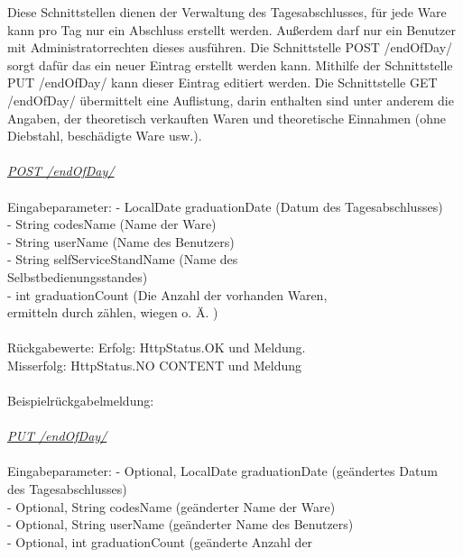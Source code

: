 Diese Schnittstellen dienen der Verwaltung des Tagesabschlusses, für jede Ware kann pro Tag nur ein Abschluss erstellt werden. Außerdem darf nur ein Benutzer mit Administratorrechten dieses ausführen.
Die Schnittstelle POST /endOfDay/ sorgt dafür das ein neuer Eintrag erstellt werden kann.
Mithilfe der Schnittstelle PUT /endOfDay/ kann dieser Eintrag editiert werden.
Die Schnittstelle GET /endOfDay/ übermittelt eine Auflistung, darin enthalten sind unter anderem die Angaben, der theoretisch verkauften Waren und theoretische Einnahmen (ohne Diebstahl, beschädigte Ware usw.). 
\\
\\
\textit{\underline{POST /endOfDay/}}
\\
\\
Eingabeparameter: \tab				- LocalDate graduationDate (Datum des Tagesabschlusses)\\
\tab\tab								- String codesName (Name der Ware)		\\
\tab\tab								- String userName (Name des Benutzers)\\
\tab\tab								- String selfServiceStandName (Name des \\
\tab\tab 								Selbstbedienungsstandes)\\
\tab\tab								- int graduationCount (Die Anzahl der vorhanden Waren, \\
\tab \tab 								ermitteln durch zählen, wiegen o. Ä. )\\									
\\
Rückgabewerte: \tab 					Erfolg: HttpStatus.OK und Meldung.\\
\tab \tab 									Misserfolg: HttpStatus.NO CONTENT und Meldung\\
\\
Beispielrückgabelmeldung:	
\\
\\
\textit{\underline{PUT /endOfDay/}}
\\
\\
Eingabeparameter: \tab				- Optional, LocalDate graduationDate (geändertes Datum \\
\tab\tab 							des Tagesabschlusses)\\
\tab\tab							- Optional,	String codesName (geänderter Name der Ware)		\\
\tab\tab							- Optional,	String userName (geänderter Name des Benutzers)\\
\tab\tab							- Optional,	int graduationCount (geänderte Anzahl der \\
